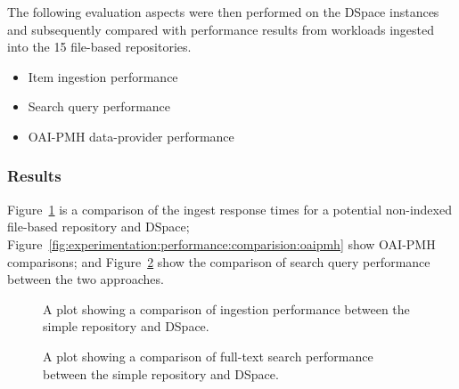 The following evaluation aspects were then performed on the DSpace instances and subsequently compared with performance results from workloads ingested into the \num{15} file-based repositories.

\begin{itemize}
 \item Item ingestion performance
 \item Search query performance
 \item OAI-PMH data-provider performance
\end{itemize}


\subsubsection{Results}
\label{sec:evaluation:performance:performance-comparison:results}

Figure~\ref{fig:experimentation:performance:comparision:ingest} is a comparison of the ingest response times for a potential non-indexed file-based repository and DSpace; Figure~\ref{fig:experimentation:performance:comparision:oaipmh} show OAI-PMH comparisons; and Figure~\ref{fig:experimentation:performance:comparision:search} show the comparison of search query performance between the two approaches.

\begin{figure}
 \centering
 \framebox[\textwidth]{%

 }
\caption[Comparison of single item ingestion performance]{A plot showing a comparison of ingestion performance between the simple repository and DSpace.}
 \label{fig:experimentation:performance:comparision:ingest}
\end{figure}

\begin{figure}
 \centering
 \framebox[\textwidth]{%

 }
\caption[Comparison of full-text search performance]{A plot showing a comparison of full-text search performance between the simple repository and DSpace.}
 \label{fig:experimentation:performance:comparision:search}
\end{figure}

